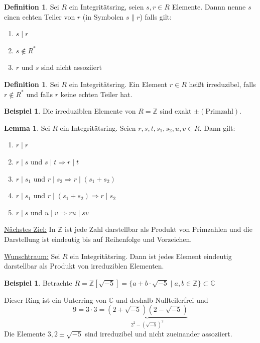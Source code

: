 \documentclass[12pt,parskip=full]{scrartcl}
\newcommand{\setZ}{\mathbb{Z}}
\newcommand{\setC}{\mathbb{C}}
\newcommand{\heading}{\underline}
\theoremstyle{definition}
\newtheorem{lemma}[theorem]{Lemma}
\newtheorem{definition}[theorem]{Definition}
\newtheorem{example}[theorem]{Beispiel}
\theoremstyle{remark}
\begin{document}
 	\begin{definition}
 		Sei $R$ ein Integritätsring, seien $s,r \in R$ Elemente. Dannn nenne $s$ einen echten Teiler von $r$ (in Symbolen $s \parallel r$) falls gilt:
 		\begin{enumerate}
 			\item $s \mid r$
 			\item $s \notin R^*$
 			\item $r$ und $s$ sind nicht assoziiert
 		\end{enumerate}
 	\end{definition}
 
 	\begin{definition}
 		Sei $R$ ein Integritätsring. Ein Element $r \in R$ heißt irreduzibel, falls $r \notin R^*$ und falls $r$ keine echten Teiler hat.
 	\end{definition}
 
 	\begin{example}
 		Die irreduziblen Elemente von $R = \setZ$ sind exakt $\pm(\text{Primzahl})$.
 	\end{example}
 
 	\begin{lemma}
 		Sei $R$ ein Integritätsring. Seien $r, s, t, s_1, s_2, u, v \in R$. Dann gilt:
 		\begin{enumerate}
 			\item $r \mid r$
 			\item $r \mid s$ und $s \mid t \Rightarrow r \mid t$
 			\item $r \mid s_1$ und $r \mid s_2 \Rightarrow r \mid (s_1 + s_2)$
 			\item $r \mid s_1$ und $r \mid (s_1 + s_2) \Rightarrow r \mid s_2$
 			\item $r \mid s$ und $u \mid v \Rightarrow ru \mid sv$
 		\end{enumerate}
 	\end{lemma}
 
 	\heading{Nächstes Ziel:} In $\setZ$ ist jede Zahl darstellbar als Produkt von Primzahlen und die Darstellung ist eindeutig bis auf Reihenfolge und Vorzeichen.
 	
 	\heading{Wunschtraum:} Sei $R$ ein Integritätsring. Dann ist jedes Element eindeutig darstellbar als Produkt von irreduziblen Elementen.
 	
 	\begin{example}
 		Betrachte $R = \setZ[\sqrt{-5}] = \{ a + b \cdot \sqrt{-5} \mid a,b \in \setZ \} \subset \setC$
 		
 		Dieser Ring ist ein Unterring von $\setC$ und deshalb Nullteilerfrei und
 		\begin{equation*}
 			9 = 3 \cdot 3 = \underbrace{(2 + \sqrt{-5})(2 - \sqrt{-5})}_{2^2 - (\sqrt{-5})^2}
 		\end{equation*}
 		Die Elemente $3, 2 \pm \sqrt{-5}$ sind irreduzibel und nicht zueinander assoziiert.
 	\end{example}
 
\end{document}
